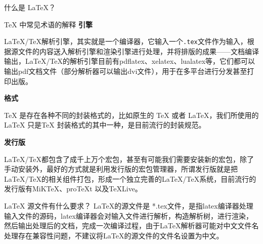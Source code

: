 \begin{faq}{什么是 \LaTeX{}？}
\end{faq}

\begin{faq}{\TeX{} 中常见术语的解释}
\textbf{引擎}
  
\LaTeX/\TeX{}解析引擎，其实就是一个编译器，它输入一个\verb|.tex|文件作为输入，根据源文件的内容送入解析引擎和渲染引擎进行处理，并将排版的成果——文档编译输出，\LaTeX/\TeX{}的解析引擎目前有pdflatex、xelatex、lualatex等，它们都可以输出pdf文档文件（部分解析器可以输出dvi文件），用于在多平台进行分发甚至打印出版。

\textbf{格式}

\TeX{} 是存在各种不同的封装格式的，比如原生的 \TeX{} 或者 \LaTeX{}，我们所使用的 \LaTeX{} 只是\TeX{} 封装格式的其中一种，是目前流行的封装规范。

\textbf{发行版}

\LaTeX/\TeX{}都包含了成千上万个宏包，甚至有可能我们需要安装新的宏包，除了手动安装外，最好的方式就是利用发行版的宏包管理器，所谓发行版就是把\LaTeX/\TeX{}的相关组件打包，形成一个独立完善的\LaTeX/\TeX{}系统，目前流行的发行版有MiKTeX、proTeXt 以及TeXLive。
\end{faq}


\begin{faq}{}

\end{faq}

\begin{faq}{\LaTeX{} 源文件有什么要求？}
LaTeX的源文件是 *.tex文件，是指latex编译器处理输入文件的源码，latex编译器会对输入文件进行解析，构造解析树，进行渲染，然后输出处理后的文档，完成一次编译过程，由于LaTeX解析器可能对中文文件名处理存在兼容性问题，不建议将LaTeX的源文件的文件名设置为中文。
\end{faq}

